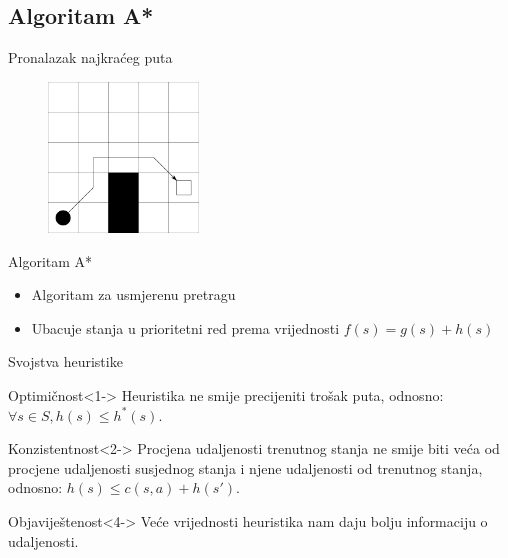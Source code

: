 \documentclass[utf8]{beamer}
\begin{document}
\subsection{Algoritam A*}

\begin{frame}{Pronalazak najkraćeg puta}
    \begin{figure}[h] 
        \centering
        \includegraphics[height=4cm]{images/basicGrid.pdf}
    \end{figure} 
\end{frame}

\begin{frame}{Algoritam A*}
    \begin{itemize}
        \item Algoritam za usmjerenu pretragu
        \item Ubacuje stanja u prioritetni red prema vrijednosti \(f(s) = g(s) + h(s)\)
    \end{itemize}
\end{frame}

\begin{frame}{Svojstva heuristike}
    \begin{block}{Optimičnost}<1->
        Heuristika ne smije precijeniti trošak puta, odnosno:
        \(\forall s \in S, h(s) \leq h^*(s)\).
    \end{block}
  
    \begin{block}{Konzistentnost}<2->
        Procjena udaljenosti trenutnog stanja ne smije biti veća od procjene udaljenosti susjednog stanja i njene udaljenosti od trenutnog stanja, odnosno:
        \(h(s) \leq c(s, a) + h(s')\).
    \end{block}


    \begin{block}{Objaviještenost}<4->
        Veće vrijednosti heuristika nam daju bolju informaciju o udaljenosti.
    \end{block}
\end{frame}
\end{document}
